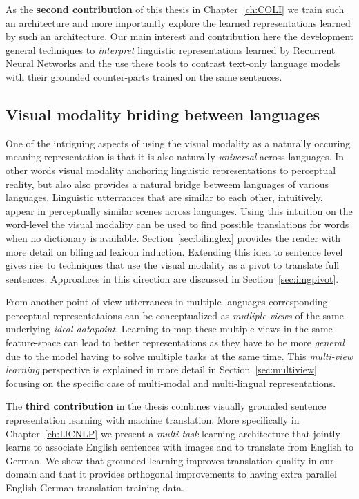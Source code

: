 As the \textbf{second contribution} of this thesis in Chapter~\ref{ch:COLI} 
we train such an architecture and more importantly explore the learned representations learned by such an architecture.
Our main interest and contribution here the development general techniques to \emph{interpret} linguistic representations learned by
Recurrent Neural Networks and the use these tools to contrast text-only language models with their grounded
counter-parts trained on the same sentences.

\subsection{Visual modality briding between languages}

One of the intriguing aspects of using the visual modality as a naturally occuring meaning representation is that it
is also naturally \emph{universal} across languages. 
In other words visual modality anchoring linguistic representations to perceptual reality, but also
also provides a natural bridge betweem languages of various languages. Linguistic utterrances that are similar 
to each other, intuitively, appear in perceptually similar scenes across languages. 
Using this intuition on the word-level the visual modality can be used to find possible translations 
for words when no dictionary is available. Section~\ref{sec:bilinglex} provides the reader with more
detail on bilingual lexicon induction. Extending this idea to sentence level gives rise to techniques that
use the visual modality as a pivot to translate full sentences. Approahces in this direction are discussed
in Section~\ref{sec:imgpivot}. 

From another point of view utterrances in multiple languages corresponding perceptual representataions 
can be conceptualized as \emph{mutliple-views} of the same underlying \emph{ideal datapoint}.
Learning to map these multiple views in the same feature-space can lead to better representations as
they have to be more \emph{general} due to the model having to solve multiple tasks at the same time. 
This \emph{multi-view learning} perspective is explained in more detail in Section~\ref{sec:multiview} 
focusing on the specific case of multi-modal and multi-lingual representations.

The \textbf{third contribution} in the thesis combines visually grounded sentence representation learning
with machine translation. More specifically in Chapter~\ref{ch:IJCNLP} we present a \emph{multi-task} 
learning architecture that jointly learns to associate English sentences with images and to translate from
English to German. We show that grounded learning improves translation quality in our domain and that 
it provides orthogonal improvements to having extra parallel English-German translation training data.

